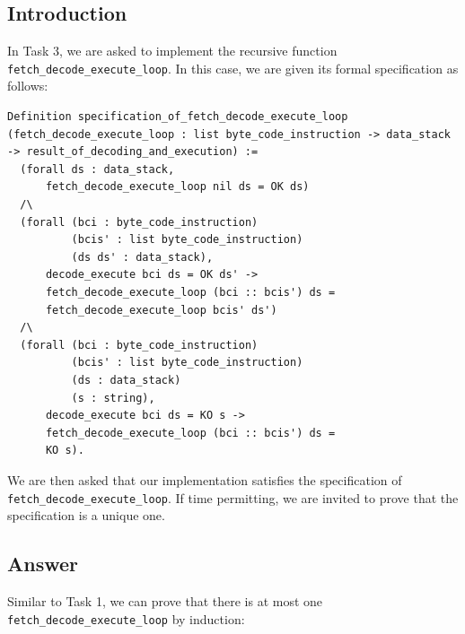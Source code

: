 \documentclass{article}
\begin{document}
\subsection{Introduction}
In Task 3, we are asked to implement the recursive function \texttt{fetch\_decode\_execute\_loop}. In this case, we are given its formal specification as follows:

\begin{lstlisting}
Definition specification_of_fetch_decode_execute_loop (fetch_decode_execute_loop : list byte_code_instruction -> data_stack -> result_of_decoding_and_execution) :=
  (forall ds : data_stack,
      fetch_decode_execute_loop nil ds = OK ds)
  /\
  (forall (bci : byte_code_instruction)
          (bcis' : list byte_code_instruction)
          (ds ds' : data_stack),
      decode_execute bci ds = OK ds' ->
      fetch_decode_execute_loop (bci :: bcis') ds =
      fetch_decode_execute_loop bcis' ds')
  /\
  (forall (bci : byte_code_instruction)
          (bcis' : list byte_code_instruction)
          (ds : data_stack)
          (s : string),
      decode_execute bci ds = KO s ->
      fetch_decode_execute_loop (bci :: bcis') ds =
      KO s).
\end{lstlisting}

We are then asked that our implementation satisfies the specification of \texttt{fetch\_decode\_execute\_loop}. If time permitting, we are invited to prove that the specification is a unique one.  

\subsection{Answer}
Similar to Task 1, we can prove that there is at most one \texttt{fetch\_decode\_execute\_loop} by induction: 
\end{document}
